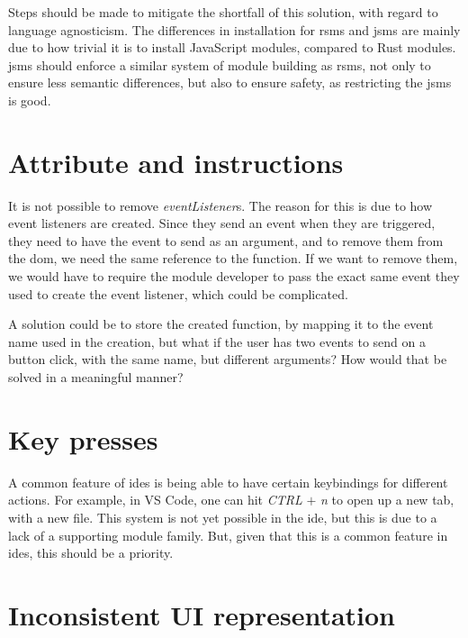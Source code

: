 Steps should be made to mitigate the shortfall of this solution, with regard to
language agnosticism. The differences in installation for \gls*{rsms} and
\gls*{jsms} are mainly due to how trivial it is to install JavaScript modules,
compared to Rust modules. \gls*{jsms} should enforce a similar system of module
building as \gls*{rsms}, not only to ensure less semantic differences, but also
to ensure safety, as restricting the \gls*{jsms} is good.

\section{Attribute and instructions}

It is not possible to remove \textit{eventListener}s. The reason for this is due
to how event listeners are created. Since they send an event when they are
triggered, they need to have the event to send as an argument, and to remove
them from the \gls*{dom}, we need the same reference to the function. If we
want to remove them, we would have to require the module developer to pass the
exact same event they used to create the event listener, which could be
complicated.

A solution could be to store the created function, by mapping it to the event
name used in the creation, but what if the user has two events to send on a
button click, with the same name, but different arguments? How would that be
solved in a meaningful manner?


\section{Key presses}

A common feature of \gls*{ide}s is being able to have certain keybindings for
different actions. For example, in VS Code, one can hit \textit{CTRL}
$+$ \textit{n} to open up a new tab, with a new file. This system is not yet
possible in the \gls*{ide}, but this is due to a lack of a supporting module
family. But, given that this is a common feature in \gls*{ide}s, this should be
a priority.


\section{Inconsistent UI representation}

